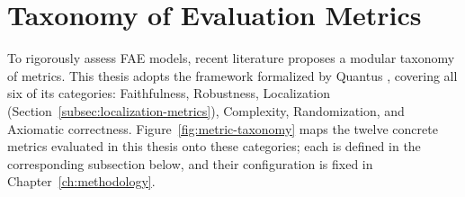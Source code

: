 \section{Taxonomy of Evaluation Metrics}
\label{sec:taxonomy}

To rigorously assess FAE models, recent literature proposes a modular taxonomy of metrics. This thesis adopts the framework formalized by Quantus \cite{hedstrom2023quantus}, covering all six of its categories: Faithfulness, Robustness, Localization (Section~\ref{subsec:localization-metrics}), Complexity, Randomization, and Axiomatic correctness. Figure~\ref{fig:metric-taxonomy} maps the twelve concrete metrics evaluated in this thesis onto these categories; each is defined in the corresponding subsection below, and their configuration is fixed in Chapter~\ref{ch:methodology}.

